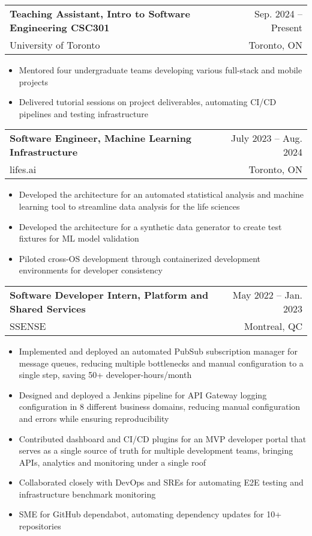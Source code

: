 \documentclass[letterpaper,11pt]{article}
\makeatletter
\newcommand{\resumeItem}[1]{
  \item\small{
    {#1 \vspace{-2pt}}
  }
}
\newcommand{\resumeSubheading}[4]{
  \vspace{-2pt}\item
    \begin{tabular*}{0.97\textwidth}[t]{l@{\extracolsep{\fill}}r}
      \textbf{#1} & #2 \\
      \small{#3} & \small{#4} \\
    \end{tabular*}\vspace{-7pt}
}
\newcommand{\resumeSubSubheading}[2]{
    \item
    \begin{tabular*}{0.97\textwidth}{l@{\extracolsep{\fill}}r}
      \textit{\small#1} & \small #2 \\
    \end{tabular*}\vspace{-7pt}
}
\newcommand{\resumeSubHeadingListEnd}{\end{itemize}}
\newcommand{\resumeItemListStart}{\begin{itemize}}
\newcommand{\resumeItemListEnd}{\end{itemize}\vspace{-5pt}}
\makeatother
\begin{document}
    \resumeSubheading
      {Teaching Assistant, Intro to Software Engineering CSC301}{Sep. 2024 -- Present}
      {University of Toronto}{Toronto, ON}
      \resumeItemListStart
        \resumeItem{Mentored four undergraduate teams developing various full-stack and mobile projects}
        \resumeItem{Delivered tutorial sessions on project deliverables, automating CI/CD pipelines and testing infrastructure}
      \resumeItemListEnd
      

    \resumeSubheading
      {Software Engineer, Machine Learning Infrastructure}{July 2023 -- Aug. 2024}
      {lifes.ai}{Toronto, ON}
      \resumeItemListStart
        \resumeItem{Developed the architecture for an automated statistical analysis and machine learning tool to streamline data analysis for the life sciences}
        \resumeItem{Developed the architecture for a synthetic data generator to create test fixtures for ML model validation}
        \resumeItem{Piloted cross-OS development through containerized development environments for developer consistency}
    \resumeItemListEnd

    \resumeSubheading
      {Software Developer Intern, Platform and Shared Services}{May 2022 -- Jan. 2023}
      {SSENSE}{Montreal, QC}
      \resumeItemListStart
        \resumeItem{Implemented and deployed an automated PubSub subscription manager for message queues, reducing multiple bottlenecks and manual configuration to a single step, saving 50+ developer-hours/month}
        \resumeItem{Designed and deployed a Jenkins pipeline for API Gateway logging configuration in 8 different business domains, reducing manual configuration and errors while ensuring reproducibility}
        \resumeItem{Contributed dashboard and CI/CD plugins for an MVP developer portal that serves as a single source of truth for multiple development teams, bringing APIs, analytics and monitoring under a single roof}
        \resumeItem{Collaborated closely with DevOps and SREs for automating E2E testing and infrastructure benchmark monitoring}
        \resumeItem{SME for GitHub dependabot, automating dependency updates for 10+ repositories}
      \resumeItemListEnd
    
\end{document}
